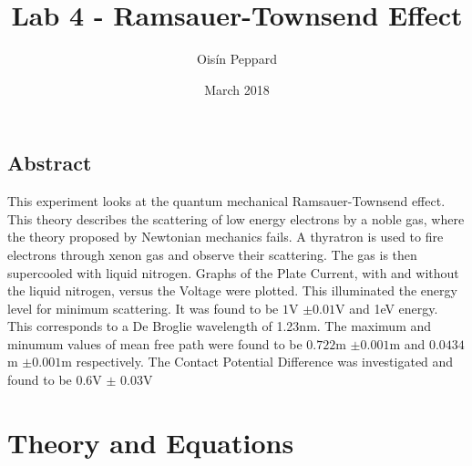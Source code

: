 \documentclass{article}
\title{Lab 4 - Ramsauer-Townsend Effect}
\author{Oisín Peppard}
\date{March 2018}
\begin{document}
\maketitle

\begin{center}
    

\section*{Abstract}
This experiment looks at the quantum mechanical Ramsauer-Townsend effect. This theory describes the scattering of low energy electrons by a noble gas, where the theory proposed by Newtonian mechanics fails. A thyratron is used to fire electrons through xenon gas and observe their scattering. The gas is then supercooled with liquid nitrogen. Graphs of the Plate Current, with and without the liquid nitrogen, versus the Voltage were plotted. This illuminated the energy level for minimum scattering. It was found to be $1$V $\pm 0.01$V and 1eV energy. This corresponds to a De Broglie wavelength of 1.23nm. The maximum and minumum values of mean free path were found to be $0.722$m $\pm0.001$m and $0.0434$m $\pm0.001$m respectively. The Contact Potential Difference was investigated and found to be 0.6V $\pm$ 0.03V
\end{center} 


\section*{Theory and Equations}
\end{document}
